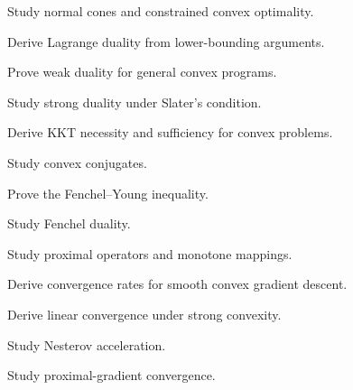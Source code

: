\begin{exercise}[4]
Study normal cones and constrained convex optimality.
\end{exercise}

\begin{exercise}[4]
Derive Lagrange duality from lower-bounding arguments.
\end{exercise}

\begin{exercise}[4]
Prove weak duality for general convex programs.
\end{exercise}

\begin{exercise}[4]
Study strong duality under Slater's condition.
\end{exercise}

\begin{exercise}[4]
Derive KKT necessity and sufficiency for convex problems.
\end{exercise}

\begin{exercise}[4]
Study convex conjugates.
\end{exercise}

\begin{exercise}[4]
Prove the Fenchel--Young inequality.
\end{exercise}

\begin{exercise}[4]
Study Fenchel duality.
\end{exercise}

\begin{exercise}[4]
Study proximal operators and monotone mappings.
\end{exercise}

\begin{exercise}[4]
Derive convergence rates for smooth convex gradient descent.
\end{exercise}

\begin{exercise}[4]
Derive linear convergence under strong convexity.
\end{exercise}

\begin{exercise}[4]
Study Nesterov acceleration.
\end{exercise}

\begin{exercise}[4]
Study proximal-gradient convergence.
\end{exercise}

